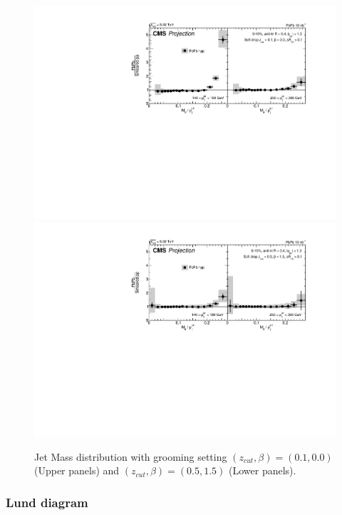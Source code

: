 \begin{figure}[!ht]
\begin{center}
\includegraphics[width=.95\textwidth]{figures/cms/MGMoneyPlot_0.pdf}
\includegraphics[width=.95\textwidth]{figures/cms/MGMoneyPlot_7.pdf}
\caption{Jet Mass distribution with grooming setting $(z_{cut},\beta)=(0.1,0.0)$ (Upper panels) and $(z_{cut},\beta)=(0.5,1.5)$ (Lower panels). \cite{CMS-FTR-17-002:2017dec}}
\label{fig:Mass}
\end{center}
\end{figure}


\newpage
\subsubsection{Lund diagram}

